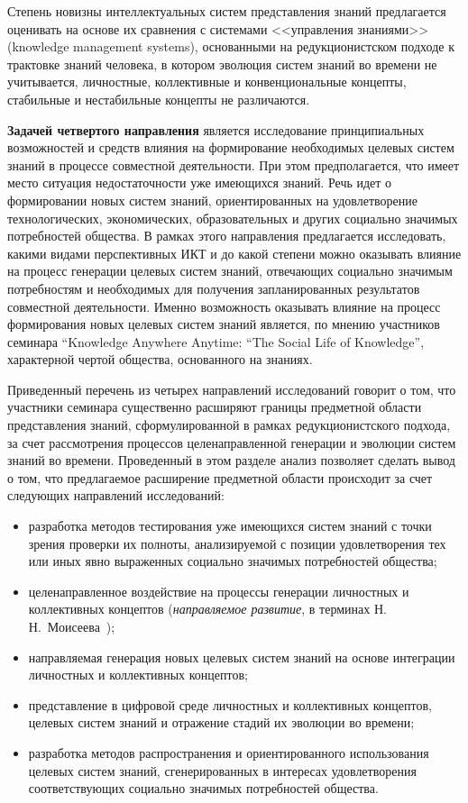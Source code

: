\begin{multicols}{2}
   Степень новизны интеллектуальных систем представления знаний предлагается
оценивать на основе их сравнения с системами <<управления знаниями>> (knowledge
management systems), основанными на редукционистском подходе к трактовке знаний
человека, в котором эволюция систем знаний во времени не учитывается, личностные,
коллективные и конвенциональные концепты, стабильные и нестабильные концепты не
различаются.

   \textbf{Задачей четвертого направления} является исследование принципиальных
возможностей и средств влияния на формирование необходимых целевых систем знаний в
процессе совместной дея\-тель\-ности. При этом предполагается, что имеет место ситуация
недостаточности уже имеющихся знаний. Речь идет о формировании новых систем знаний,
ориентированных на удовлетворение технологических, экономических, образовательных и
других социально значимых потребностей общества. В рамках этого направления
предлагается исследовать, какими видами перспективных ИКТ и до какой степени можно
оказывать влияние на процесс генерации целевых систем знаний, отвечающих социально
значимым потребностям и необходимых для получения запланированных результатов
совместной деятельности. Именно возможность оказывать влияние на процесс
формирования новых целевых систем знаний является, по мнению участников семинара
``Knowledge Anywhere Anytime: ``The Social Life of Knowledge'', характерной чертой
общества, основанного на знаниях.

   Приведенный перечень из четырех направлений исследований говорит о том, что
участники семинара существенно расширяют границы предметной области представления
знаний, сформулированной в рамках редукционистского подхода, за счет рассмотрения
процессов целенаправленной генерации и эволюции систем знаний во времени.
Проведенный в этом разделе анализ позволяет сделать вывод о том, что предлагаемое
расширение предметной области происходит за счет следующих направлений исследований:
   \begin{itemize}
\item разработка методов тестирования уже име\-ющих\-ся систем знаний с точки зрения
проверки их полноты, анализируемой с позиции удовлетворения тех или иных явно
выраженных социально значимых потребностей общества;
\item целенаправленное воздействие на процессы генерации личностных и
коллективных концептов (\textit{направляемое развитие}, в терминах
Н.\,Н.~Моисеева~\cite{20za});
\item направляемая генерация новых целевых систем знаний на основе интеграции
личностных и коллективных концептов;
\item представление в цифровой среде личностных и коллективных концептов,
целевых систем знаний и отражение стадий их эволюции во вре\-мени;
\item разработка методов распространения и ориентированного использования
целевых систем знаний, сгенерированных в интересах удовлетворения
соответствующих социально значимых потребностей общества.
\end{itemize}


\end{multicols}
